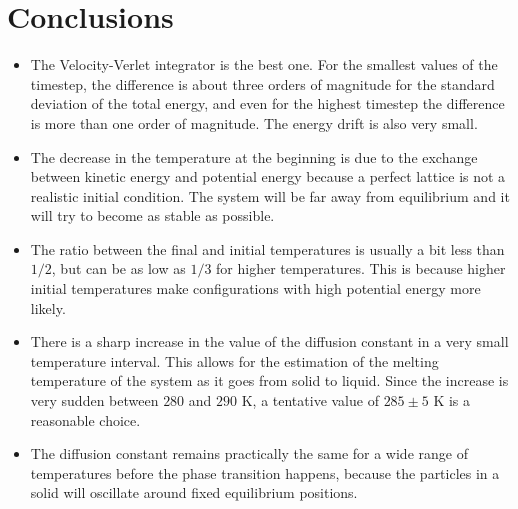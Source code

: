 \documentclass{beamer}
\begin{document}
	\section{Conclusions}
	
		\begin{frame}{\secname}
			\begin{itemize}
				\item The Velocity-Verlet integrator is the best one. For the smallest values of the timestep, the difference is about three orders of magnitude for the standard deviation of the total energy, and even for the highest timestep the difference is more than one order of magnitude. The energy drift is also very small.
				\item The decrease in the temperature at the beginning is due to the exchange between kinetic energy and potential energy because a perfect lattice is not a realistic initial condition. The system will be far away from equilibrium and it will try to become as stable as possible.
				\item The ratio between the final and initial temperatures is usually a bit less than $1/2$, but can be as low as $1/3$ for higher temperatures. This is because higher initial temperatures make configurations with high potential energy more likely.
			\end{itemize}
		\end{frame}
		
		\begin{frame}{\secname}
			\begin{itemize}
				\item There is a sharp increase in the value of the diffusion constant in a very small temperature interval. This allows for the estimation of the melting temperature of the system as it goes from solid to liquid. Since the increase is very sudden between $280$ and $290$ K, a tentative value of $285\pm5$ K is a reasonable choice.
				\item The diffusion constant remains practically the same for a wide range of temperatures before the phase transition happens, because the particles in a solid will oscillate around fixed equilibrium positions.
			\end{itemize}
		\end{frame}
	
	
\end{document}
